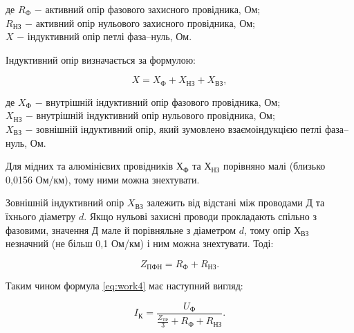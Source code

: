 \noindent де $R_{\text{Ф}}$ $-$ активний опір фазового захисного провідника, Ом; \\
\hspace*{15pt} $R_{\text{НЗ}}$ $-$ активний опір нульового захисного провідника, Ом; \\
\hspace*{15pt} $X$ $-$  індуктивний опір петлі фаза–нуль, Ом. 

\vspace{1.5em}

Індуктивний опір визначається за формулою:

\begin{equation}\label{eq:work7}
	X = X_{\text{Ф}} + X_{\text{НЗ}} + X_{\text{ВЗ}},
\end{equation}

\noindent де $X_{\text{Ф}}$ $-$ внутрішній індуктивний опір фазового провідника,  Ом; \\
\hspace*{15pt} $X_{\text{НЗ}}$ $-$ внутрішній індуктивний опір нульового провідника,  Ом; \\
\hspace*{15pt} $X_{\text{ВЗ}}$ $-$ зовнішній індуктивний опір, який зумовлено взаємоіндукцією \newline
\hspace*{15pt}петлі фаза–нуль, Ом.

\vspace{1.5em}

Для мідних та алюмінієвих провідників $Х_{\text{Ф}}$ та $Х_{\text{НЗ}}$ порівняно малі (близько 0,0156 Ом/км), тому ними можна знехтувати.

Зовнішній індуктивний опір $X_{\text{ВЗ}}$ залежить від відстані між проводами Д та їхнього діаметру $d$. Якщо нульові захисні проводи прокладають спільно з фазовими, значення Д  мале й порівняльне з діаметром $d$, тому опір $Х_{\text{ВЗ}}$ незначний (не більш 0,1 Ом/км) і ним можна знехтувати. Тоді:

\begin{equation}\label{eq:work8}
	Z_{\text{ПФН}} = R_{\text{Ф}} + R_{\text{НЗ}}.
\end{equation}

\vspace{1.5em}

Таким чином формула \ref{eq:work4} має наступний вигляд:

\begin{equation}\label{eq:work9}
	I_{\text{К}} = \frac{U_{\text{Ф}}}{\frac{Z_{\text{ТР}}}{3} + R_{\text{Ф}} + R_{\text{НЗ}}}.
\end{equation}

